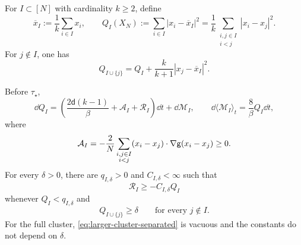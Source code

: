 \documentclass[11pt,reqno]{amsart}
\numberwithin{equation}{section}
\theoremstyle{plain}
\theoremstyle{remark}
\renewcommand{\d}{\mathsf{d}}\newcommand{\s}{\mathsf{s}}
\begin{document}
For $I\subset[N]$ with cardinality $k\ge2$, define
\begin{equation}\label{eq:cluster-dispersion}
 \overline x_I:=\frac1k\sum_{i\in I}x_i,
 \qquad
 Q_I(X_N):=\sum_{i\in I}|x_i-\overline x_I|^2
 =\frac1k\sum_{\substack{i,j\in I\\i<j}}|x_i-x_j|^2.
\end{equation}
For $j\notin I$, one has
\begin{equation}\label{eq:cluster-enlargement}
 Q_{I\cup\{j\}}=Q_I+\frac{k}{k+1}|x_j-\overline x_I|^2.
\end{equation}

\begin{lemma}\label{lem:cluster-ito}
Before $\tau_\star$,
\begin{equation}\label{eq:cluster-ito}
 \dd Q_I=\left(\frac{2\d(k-1)}\beta+\mathcal A_I+\mathcal R_I\right)\dd t+\dd\mathcal M_I,
 \qquad
 \dd\langle\mathcal M_I\rangle_t=\frac8\beta Q_I\dd t,
\end{equation}
where
\begin{equation}\label{eq:cluster-internal-term}
 \mathcal A_I=-\frac2N\sum_{\substack{i,j\in I\\i<j}}
 (x_i-x_j)\cdot\nabla\mathsf g(x_i-x_j)\ge0.
\end{equation}
For every $\delta>0$, there are $q_{I,\delta}>0$ and $C_{I,\delta}<\infty$ such that
\begin{equation}\label{eq:cluster-remainder-bound}
 \mathcal R_I\ge-C_{I,\delta}Q_I
\end{equation}
whenever $Q_I<q_{I,\delta}$ and
\begin{equation}\label{eq:larger-cluster-separated}
 Q_{I\cup\{j\}}\ge\delta\qquad\text{for every }j\notin I.
\end{equation}
For the full cluster, \eqref{eq:larger-cluster-separated} is vacuous and the constants do not depend on $\delta$.
\end{lemma}
\end{document}
